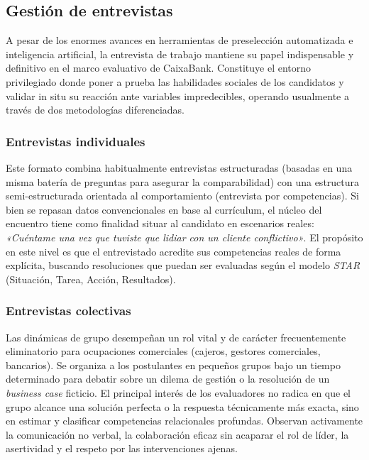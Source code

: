 \subsection{Gestión de entrevistas}

A pesar de los enormes avances en herramientas de preselección automatizada e inteligencia artificial, la entrevista de trabajo mantiene su papel indispensable y definitivo en el marco evaluativo de CaixaBank. Constituye el entorno privilegiado donde poner a prueba las habilidades sociales de los candidatos y validar in situ su reacción ante variables impredecibles, operando usualmente a través de dos metodologías diferenciadas.

\subsubsection{Entrevistas individuales}
Este formato combina habitualmente entrevistas estructuradas (basadas en una misma batería de preguntas para asegurar la comparabilidad) con una estructura semi-estructurada orientada al comportamiento (entrevista por competencias). Si bien se repasan datos convencionales en base al currículum, el núcleo del encuentro tiene como finalidad situar al candidato en escenarios reales: \textit{«Cuéntame una vez que tuviste que lidiar con un cliente conflictivo»}. El propósito en este nivel es que el entrevistado acredite sus competencias reales de forma explícita, buscando resoluciones que puedan ser evaluadas según el modelo \textit{STAR} (Situación, Tarea, Acción, Resultados).

\subsubsection{Entrevistas colectivas}
Las dinámicas de grupo desempeñan un rol vital y de carácter frecuentemente eliminatorio para ocupaciones comerciales (cajeros, gestores comerciales, bancarios). Se organiza a los postulantes en pequeños grupos bajo un tiempo determinado para debatir sobre un dilema de gestión o la resolución de un \textit{business case} ficticio. El principal interés de los evaluadores no radica en que el grupo alcance una solución perfecta o la respuesta técnicamente más exacta, sino en estimar y clasificar competencias relacionales profundas. Observan activamente la comunicación no verbal, la colaboración eficaz sin acaparar el rol de líder, la asertividad y el respeto por las intervenciones ajenas.

